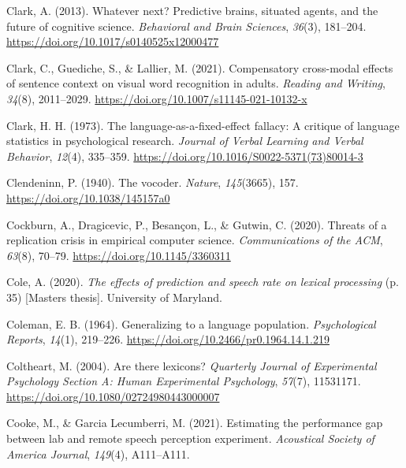 \documentclass[a4paper, nobind]{templates/ociamthesis}
\newlength{\cslhangindent}
\newenvironment{CSLReferences}[2] %
 {%
  \setlength{\parindent}{0pt}
  \ifodd #1
  \let\oldpar\par
  \def\par{\hangindent=\cslhangindent\oldpar}
  \fi
  \setlength{\parskip}{1mm}
  \setlength{\baselineskip}{6mm}
 }%
 {}
\begin{document}
\begin{CSLReferences}{1}{0}
\leavevmode{}%
Clark, A. (2013). Whatever next? Predictive brains, situated agents, and the future of cognitive science. \emph{Behavioral and Brain Sciences}, \emph{36}(3), 181--204. \url{https://doi.org/10.1017/s0140525x12000477}

\leavevmode{}%
Clark, C., Guediche, S., \& Lallier, M. (2021). {Compensatory cross-modal effects of sentence context on visual word recognition in adults}. \emph{Reading and Writing}, \emph{34}(8), 2011--2029. \url{https://doi.org/10.1007/s11145-021-10132-x}

\leavevmode{}%
Clark, H. H. (1973). {The language-as-a-fixed-effect fallacy: A critique of language statistics in psychological research}. \emph{Journal of Verbal Learning and Verbal Behavior}, \emph{12}(4), 335--359. \url{https://doi.org/10.1016/S0022-5371(73)80014-3}

\leavevmode{}%
Clendeninn, P. (1940). {The vocoder}. \emph{Nature}, \emph{145}(3665), 157. \url{https://doi.org/10.1038/145157a0}

\leavevmode{}%
Cockburn, A., Dragicevic, P., Besançon, L., \& Gutwin, C. (2020). {Threats of a replication crisis in empirical computer science}. \emph{Communications of the ACM}, \emph{63}(8), 70--79. \url{https://doi.org/10.1145/3360311}

\leavevmode{}%
Cole, A. (2020). \emph{{The effects of prediction and speech rate on lexical processing}} (p. 35) {[}Masters thesis{]}. University of Maryland.

\leavevmode{}%
Coleman, E. B. (1964). {Generalizing to a language population}. \emph{Psychological Reports}, \emph{14}(1), 219--226. \url{https://doi.org/10.2466/pr0.1964.14.1.219}

\leavevmode{}%
Coltheart, M. (2004). Are there lexicons? \emph{Quarterly Journal of Experimental Psychology Section A: Human Experimental Psychology}, \emph{57}(7), 11531171. \url{https://doi.org/10.1080/02724980443000007}

\leavevmode{}%
Cooke, M., \& Garcia Lecumberri, M. (2021). Estimating the performance gap between lab and remote speech perception experiment. \emph{Acoustical Society of America Journal}, \emph{149}(4), A111--A111.


\end{CSLReferences}
\end{document}

